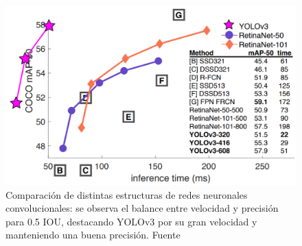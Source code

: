 \begin{figure} [h!]
    \centering
    \includegraphics[width=1\textwidth]{img/ComparacionRN.png}
    \caption{Comparación de distintas estructuras de redes neuronales convolucionales: se observa el balance entre velocidad y precisión para 0.5 IOU, destacando YOLOv3 por su gran velocidad y manteniendo una buena precisión. Fuente\cite{yolov3}}
    \label{fig:comparacion RN}
\end{figure}
%      

